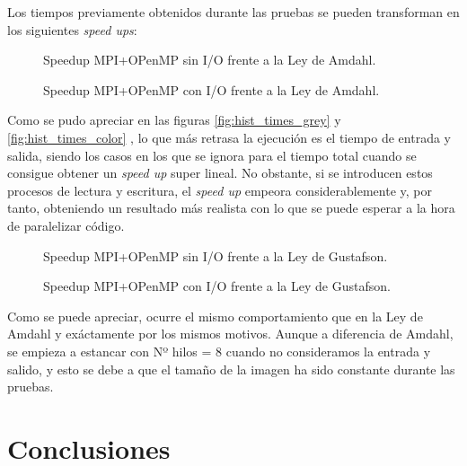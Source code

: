 \documentclass[12pt]{report} %
\begin{document}
Los tiempos previamente obtenidos durante las pruebas se pueden transforman en los siguientes \textit{speed ups}:

\begin{figure}[H]
	\makebox[\textwidth][c]{
        
    }
	\caption{Speedup MPI+OPenMP sin I/O frente a la Ley de Amdahl.}
    \label{fig:comparacion_speedup}
\end{figure}
\begin{figure}[H]
	\makebox[\textwidth][c]{
        
    }
	\caption{Speedup MPI+OPenMP con I/O frente a la Ley de Amdahl.}
    \label{fig:comparacion_speedup}
\end{figure}

Como se pudo apreciar en las figuras \ref{fig:hist_times_grey}  y
\ref{fig:hist_times_color} , lo que más retrasa la
ejecución es el tiempo de entrada y salida, siendo los casos en los que se ignora para el tiempo total
cuando se consigue obtener un \textit{speed up} super lineal. No obstante,
si se introducen estos procesos de lectura y escritura, el \textit{speed up} empeora considerablemente y, por
tanto, obteniendo un resultado más realista con lo que se puede esperar a la hora de paralelizar código.

\begin{figure}[H]
	\makebox[\textwidth][c]{
        
    }
	\caption{Speedup MPI+OPenMP sin I/O frente a la Ley de Gustafson.}
    \label{fig:comparacion_speedup}
\end{figure}
\begin{figure}[H]
	\makebox[\textwidth][c]{
        
    }
	\caption{Speedup MPI+OPenMP con I/O frente a la Ley de Gustafson.}
    \label{fig:comparacion_speedup}
\end{figure}

Como se puede apreciar, ocurre el mismo comportamiento que en la Ley de Amdahl y exáctamente por
los mismos motivos. Aunque a diferencia de Amdahl, se empieza a estancar con Nº hilos = 8 cuando no consideramos
la entrada y salido, y esto se debe a que el tamaño de la imagen ha sido constante durante las pruebas.

\chapter{Conclusiones}
\end{document}
